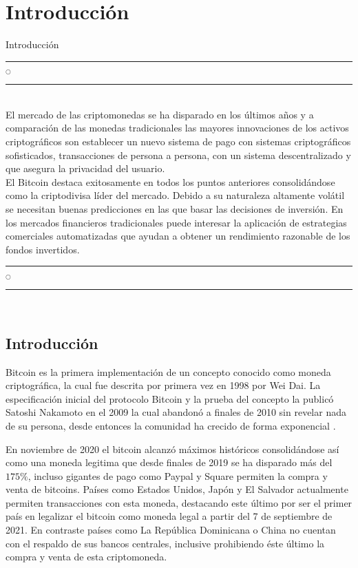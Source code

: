 \chapter[Introducción]{Introducción}{Introducción}\label{Intro}
\noindent
\rule{0.49\textwidth}{0.75pt} $_{\bigcirc}$ \rule{0.49\textwidth}{0.75pt}\\

El mercado de las criptomonedas se ha disparado en los últimos años y a comparación  de las monedas tradicionales las mayores innovaciones de los activos criptográficos son establecer un nuevo sistema de pago con sistemas criptográficos sofisticados, transacciones de persona a persona, con un sistema descentralizado y que asegura la privacidad del usuario.\\
El Bitcoin destaca exitosamente en todos los puntos anteriores consolidándose como la criptodivisa líder del mercado.
Debido a su naturaleza altamente volátil se necesitan buenas predicciones en las que basar las decisiones de inversión. En los mercados financieros tradicionales puede interesar la aplicación de estrategias comerciales automatizadas que ayudan a obtener un rendimiento razonable de los fondos invertidos.\\

\noindent
\rule{0.49\textwidth}{0.75pt} $_{\bigcirc}$ \rule{0.49\textwidth}{0.75pt}\\
\clearpage

\section{Introducción}
Bitcoin es la primera implementación de un concepto conocido como moneda criptográfica, la cual fue descrita por primera vez en 1998 por Wei Dai. La especificación inicial del protocolo Bitcoin y la prueba del concepto la publicó Satoshi Nakamoto en el 2009  la cual abandonó a finales de 2010 sin revelar nada de su persona, desde entonces la comunidad ha crecido de forma exponencial \parencite{nakamotoBitcoinPeertoPeerElectronic2008}.

En noviembre de 2020 el bitcoin alcanzó máximos históricos \parencite{BitcoinUSDBTCUSD} consolidándose así como una moneda legitima que desde finales de 2019 se ha disparado más del $175\%$, incluso gigantes de pago como Paypal y Square permiten la compra y venta de bitcoins. Países como Estados Unidos, Japón y El Salvador actualmente permiten transacciones con esta moneda, destacando este último por ser el primer país en legalizar el bitcoin como moneda legal a partir del 7 de septiembre de 2021. En contraste países como La República Dominicana o China no cuentan con el respaldo de sus bancos centrales, inclusive prohibiendo éste último la compra y venta de esta criptomoneda.

